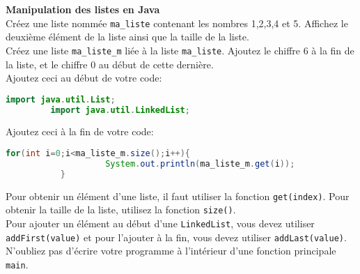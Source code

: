 	\begin{Exercice}[10 minutes] \textbf{Manipulation des listes en Java}\\
      	Créez une liste nommée \lstinline{ma_liste} contenant les nombres 1,2,3,4 et 5. Affichez le deuxième élément de la liste ainsi que la taille de la liste. \\
      	
      	Créez une liste \lstinline{ma_liste_m} liée à la liste \lstinline{ma_liste}. Ajoutez le chiffre 6 à la fin de la liste, et le chiffre 0 au début de cette dernière. \\
      	
      	Ajoutez ceci au début de votre code:
      	\begin{lstlisting}[language=Java]
             import java.util.List;
	     import java.util.LinkedList; \end{lstlisting}
	     
	     Ajoutez ceci à la fin de votre code:
	     
	    \begin{lstlisting}[language=Java]
             for(int i=0;i<ma_liste_m.size();i++){
            		System.out.println(ma_liste_m.get(i));
	       } \end{lstlisting} 
    
        \begin{conseil}
            Pour obtenir un élément d'une liste, il faut utiliser la fonction \lstinline{get(index)}. Pour obtenir la taille de la liste, utilisez la fonction \lstinline{size()}. \\
            
            Pour ajouter un élément au début d'une \lstinline{LinkedList}, vous devez utiliser \lstinline{addFirst(value)} et pour l'ajouter à la fin, vous devez utiliser \lstinline{addLast(value)}. \\
            
           	N'oubliez pas d'écrire votre programme à l'intérieur d'une fonction principale \lstinline{main}. \\
           	
           	
		     
        \end{conseil}
        
        \begin{solution}
            
        \end{solution}
    \end{Exercice}
    
